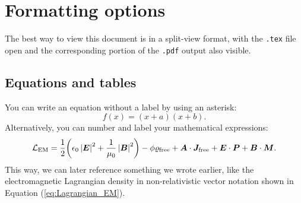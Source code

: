 \chapter{Formatting options}\label{ch:introduction}

The best way to view this document is in a split-view format, with the \texttt{.tex} file open and the corresponding portion of the \texttt{.pdf} output also visible.

\section{Equations and tables}\label{sec:equationexamples}

You can write an equation without a label by using an asterisk:
\begin{equation*}
f(x) = (x+a)(x+b).
\end{equation*}
Alternatively, you can number and label your mathematical expressions:
\begin{equation}\label{eq:Lagrangian_EM}
\mathcal{L}_{\text{EM}} 
  = \frac{1}{2} \biggl( \epsilon_{0} \left| \boldsymbol{E} \right|^{2} + \frac{1}{\mu_{0}} \left| \boldsymbol{B} \right|^{2} \biggr)
   - \phi \varrho_{\text{free}} + \boldsymbol{A} \cdot \boldsymbol{J}_{\text{free}}
   + \boldsymbol{E} \cdot \boldsymbol{P} + \boldsymbol{B} \cdot \boldsymbol{M}.
\end{equation}
This way, we can later reference something we wrote earlier, like the electromagnetic Lagrangian density in non-relativistic vector notation shown in Equation (\ref{eq:Lagrangian_EM}).\\

